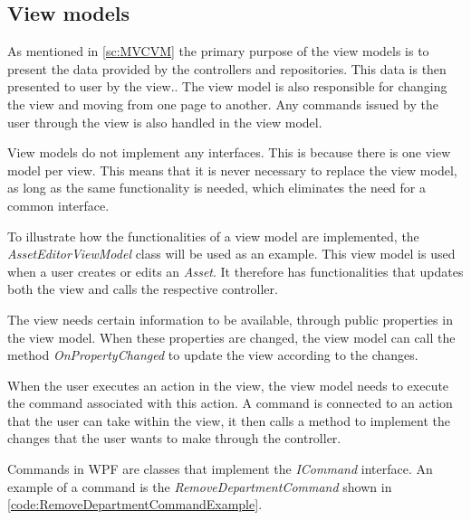 \subsection{View models} \label{sc:ViewModels}
As mentioned in \autoref{sc:MVCVM} the primary purpose of the view models is to present the data provided by the controllers and repositories. This data is then presented to user by the view.. The view model is also responsible for changing the view and moving from one page to another. Any commands issued by the user through the view is also handled in the view model. 
\par 
View models do not implement any interfaces. This is because there is one view model per view. This means that it is never necessary to replace the view model, as long as the same functionality is needed, which eliminates the need for a common interface.
\par
To illustrate how the functionalities of a view model are implemented, the \textit{AssetEditorViewModel} class will be used as an example. This view model is used when a user creates or edits an \textit{Asset}. It therefore has functionalities that updates both the view and calls the respective controller. 
\par
The view needs certain information to be available, through public properties in the view model. When these properties are changed, the view model can call the method \textit{OnPropertyChanged} to update the view according to the changes. 
\par
When the user executes an action in the view, the view model needs to execute the command associated with this action. A command is connected to an action that the user can take within the view, it then calls a method to implement the changes that the user wants to make through the controller. 
\par
Commands in WPF are classes that implement the \textit{ICommand} interface. 
An example of a command is the \textit{RemoveDepartmentCommand} shown in \autoref{code:RemoveDepartmentCommandExample}.

